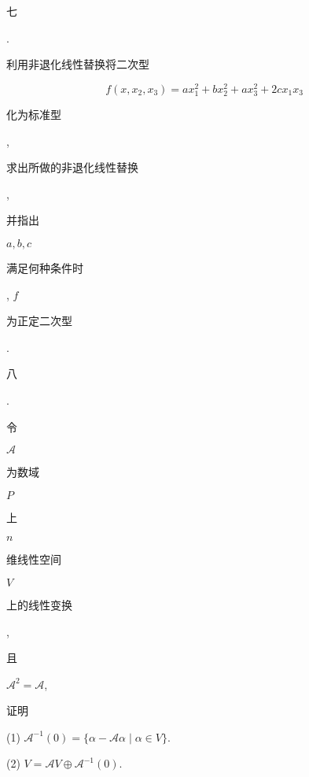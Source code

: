 \documentclass[10pt]{article}
\begin{document}
\begin{CJK}{UTF8}{mj}七\end{CJK}. \begin{CJK}{UTF8}{mj}利用非退化线性替换将二次型\end{CJK}
$$
f\left(x, x_{2}, x_{3}\right)=a x_{1}^{2}+b x_{2}^{2}+a x_{3}^{2}+2 c x_{1} x_{3}
$$
\begin{CJK}{UTF8}{mj}化为标准型\end{CJK}, \begin{CJK}{UTF8}{mj}求出所做的非退化线性替换\end{CJK}, \begin{CJK}{UTF8}{mj}并指出\end{CJK} $a, b, c$ \begin{CJK}{UTF8}{mj}满足何种条件时\end{CJK}, $f$ \begin{CJK}{UTF8}{mj}为正定二次型\end{CJK}.

\begin{CJK}{UTF8}{mj}八\end{CJK}. \begin{CJK}{UTF8}{mj}令\end{CJK} $\mathscr{A}$ \begin{CJK}{UTF8}{mj}为数域\end{CJK} $P$ \begin{CJK}{UTF8}{mj}上\end{CJK} $n$ \begin{CJK}{UTF8}{mj}维线性空间\end{CJK} $V$ \begin{CJK}{UTF8}{mj}上的线性变换\end{CJK}, \begin{CJK}{UTF8}{mj}且\end{CJK} $\mathscr{A}^{2}=\mathscr{A}$, \begin{CJK}{UTF8}{mj}证明\end{CJK}

(1) $\mathscr{A}^{-1}(0)=\{\alpha-\mathscr{A} \alpha \mid \alpha \in V\}$.

(2) $V=\mathscr{A} V \oplus \mathscr{A}^{-1}(0)$.
\end{document}
